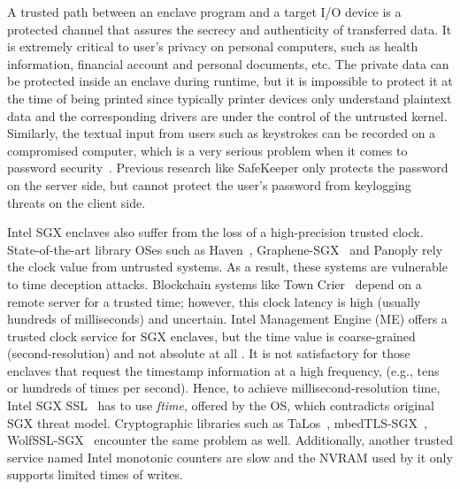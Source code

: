 A trusted path between an enclave program and a target I/O device is a protected channel that assures the secrecy and authenticity of transferred data. It is extremely critical to user's privacy on personal computers, such as health information, financial account and personal documents, etc. The private data can be protected inside an enclave during runtime, but it is impossible to protect it at the time of being printed since typically printer devices only understand plaintext data and the corresponding drivers are under the control of the untrusted kernel. Similarly, the textual input from users such as keystrokes can be recorded on a compromised computer, which is a very serious problem when it comes to password security~\cite{DBLP:conf/uss/SilverJBCJ14}. Previous research like SafeKeeper \cite{DBLP:conf/www/KrawieckaKPMA18} only protects the password on the server side, but cannot protect the user's password from keylogging threats on the client side.

Intel SGX enclaves also suffer from the loss of a high-precision trusted clock. State-of-the-art library OSes such as Haven~\cite{DBLP:journals/tocs/BaumannPH15}, Graphene-SGX~\cite{DBLP:conf/usenix/TsaiPV17} and Panoply \cite{shinde_panoply:_2017} rely the clock value from  untrusted systems. As a result, these systems are vulnerable to time deception attacks. Blockchain systems like Town Crier~\cite{DBLP:conf/ccs/ZhangCCJS16} depend on a remote server for a trusted time; however, this clock latency is high (usually hundreds of milliseconds) and uncertain. Intel Management Engine (ME) offers a trusted clock service for SGX enclaves, but the time value is coarse-grained (second-resolution) and not absolute at all \cite{intel_psw}. It is not satisfactory for those enclaves that request the timestamp information at a high frequency, (e.g., tens or hundreds of times per second). Hence, to achieve millisecond-resolution time, Intel SGX SSL~\cite{intel_sgx_ssl} has to use \textit{ftime}, offered by the OS, which contradicts original SGX threat model. Cryptographic libraries such as TaLos~\cite{TaLoS}, mbedTLS-SGX~\cite{mbedtls}, WolfSSL-SGX~\cite{wolfSSL} encounter the same problem as well. Additionally, another trusted service named Intel monotonic counters are slow and the NVRAM used by it only supports limited times of writes.

